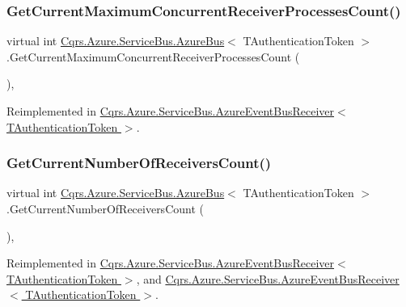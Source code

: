 \subsubsection{\texorpdfstring{Get\+Current\+Maximum\+Concurrent\+Receiver\+Processes\+Count()}{GetCurrentMaximumConcurrentReceiverProcessesCount()}}
{\footnotesize\ttfamily virtual int \hyperlink{classCqrs_1_1Azure_1_1ServiceBus_1_1AzureBus}{Cqrs.\+Azure.\+Service\+Bus.\+Azure\+Bus}$<$ T\+Authentication\+Token $>$.Get\+Current\+Maximum\+Concurrent\+Receiver\+Processes\+Count (\begin{DoxyParamCaption}{ }\end{DoxyParamCaption})\hspace{0.3cm}{\ttfamily [protected]}, {\ttfamily [virtual]}}



Reimplemented in \hyperlink{classCqrs_1_1Azure_1_1ServiceBus_1_1AzureEventBusReceiver_a4c16501e26662fc8bc15613eeb3673d7_a4c16501e26662fc8bc15613eeb3673d7}{Cqrs.\+Azure.\+Service\+Bus.\+Azure\+Event\+Bus\+Receiver$<$ T\+Authentication\+Token $>$}.

\mbox{\label{classCqrs_1_1Azure_1_1ServiceBus_1_1AzureBus_a8489f49aa20b972411e12465baa1bd14_a8489f49aa20b972411e12465baa1bd14}} 
\subsubsection{\texorpdfstring{Get\+Current\+Number\+Of\+Receivers\+Count()}{GetCurrentNumberOfReceiversCount()}}
{\footnotesize\ttfamily virtual int \hyperlink{classCqrs_1_1Azure_1_1ServiceBus_1_1AzureBus}{Cqrs.\+Azure.\+Service\+Bus.\+Azure\+Bus}$<$ T\+Authentication\+Token $>$.Get\+Current\+Number\+Of\+Receivers\+Count (\begin{DoxyParamCaption}{ }\end{DoxyParamCaption})\hspace{0.3cm}{\ttfamily [protected]}, {\ttfamily [virtual]}}



Reimplemented in \hyperlink{classCqrs_1_1Azure_1_1ServiceBus_1_1AzureEventBusReceiver_a153e44d4d94a6d812e3990cc2a417eed_a153e44d4d94a6d812e3990cc2a417eed}{Cqrs.\+Azure.\+Service\+Bus.\+Azure\+Event\+Bus\+Receiver$<$ T\+Authentication\+Token $>$}, and \hyperlink{classCqrs_1_1Azure_1_1ServiceBus_1_1AzureEventBusReceiver_a153e44d4d94a6d812e3990cc2a417eed_a153e44d4d94a6d812e3990cc2a417eed}{Cqrs.\+Azure.\+Service\+Bus.\+Azure\+Event\+Bus\+Receiver$<$ T\+Authentication\+Token $>$}.

